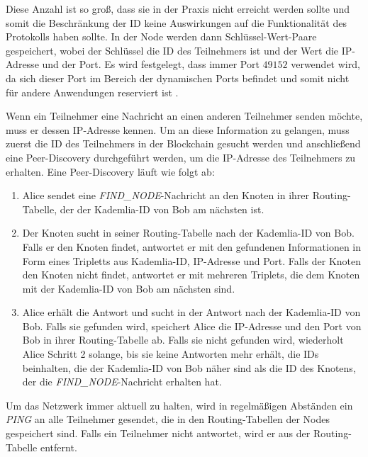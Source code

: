 Diese Anzahl ist so groß, dass sie in der Praxis nicht erreicht werden sollte und somit die Beschränkung der ID keine Auswirkungen auf die Funktionalität des Protokolls haben sollte.
In der Node werden dann Schlüssel-Wert-Paare gespeichert, wobei der Schlüssel die ID des Teilnehmers ist und der Wert die IP-Adresse und der Port. Es wird festgelegt, dass immer Port $49152$ verwendet wird, da sich dieser Port im Bereich der dynamischen Ports befindet und somit nicht für andere Anwendungen reserviert ist \parencite[S. 20]{rfc6335_IANA_Ports}. 

Wenn ein Teilnehmer eine Nachricht an einen anderen Teilnehmer senden möchte, muss er dessen IP-Adresse kennen. Um an diese Information zu gelangen, muss zuerst die ID des Teilnehmers in der Blockchain gesucht werden und anschließend eine Peer-Discovery durchgeführt werden, um die IP-Adresse des Teilnehmers zu erhalten. Eine Peer-Discovery läuft wie folgt ab:

\begin{enumerate}
    \item Alice sendet eine \textit{FIND\_NODE}-Nachricht an den Knoten in ihrer Routing-Tabelle, der der Kademlia-ID von Bob am nächsten ist. 
    \item Der Knoten sucht in seiner Routing-Tabelle nach der Kademlia-ID von Bob. Falls er den Knoten findet, antwortet er mit den gefundenen Informationen in Form eines Tripletts aus Kademlia-ID, IP-Adresse und Port. Falls der Knoten den Knoten nicht findet, antwortet er mit mehreren Triplets, die dem Knoten mit der Kademlia-ID von Bob am nächsten sind.
    \item Alice erhält die Antwort und sucht in der Antwort nach der Kademlia-ID von Bob. Falls sie gefunden wird, speichert Alice die IP-Adresse und den Port von Bob in ihrer Routing-Tabelle ab. Falls sie nicht gefunden wird, wiederholt Alice Schritt 2 solange, bis sie keine Antworten mehr erhält, die IDs beinhalten, die der Kademlia-ID von Bob näher sind als die ID des Knotens, der die \textit{FIND\_NODE}-Nachricht erhalten hat.
\end{enumerate}


\noindent Um das Netzwerk immer aktuell zu halten, wird in regelmäßigen Abständen ein \textit{PING} an alle Teilnehmer gesendet, die in den Routing-Tabellen der Nodes gespeichert sind. Falls ein Teilnehmer nicht antwortet, wird er aus der Routing-Tabelle entfernt.
